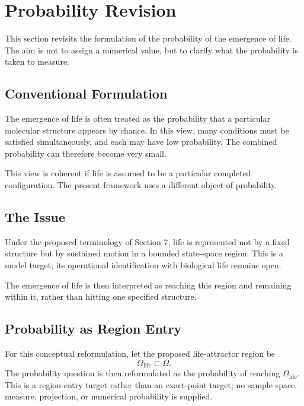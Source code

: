 \section{Probability Revision}

This section revisits the formulation of the probability of the emergence of life. The aim is not to assign a numerical value, but to clarify what the probability is taken to measure.

\subsection{Conventional Formulation}

The emergence of life is often treated as the probability that a particular molecular structure appears by chance. In this view, many conditions must be satisfied simultaneously, and each may have low probability. The combined probability can therefore become very small.

This view is coherent if life is assumed to be a particular completed configuration. The present framework uses a different object of probability.

\subsection{The Issue}

Under the proposed terminology of Section 7, life is represented not by a fixed structure but by sustained motion in a bounded state-space region. This is a model target; its operational identification with biological life remains open.

The emergence of life is then interpreted as reaching this region and remaining within it, rather than hitting one specified structure.

\subsection{Probability as Region Entry}

For this conceptual reformulation, let the proposed life-attractor region be
\begin{equation}
  \Omega_{\mathrm{life}} \subset \Omega.
\end{equation}
The probability question is then reformulated as the probability of reaching \(\Omega_{\mathrm{life}}\). This is a region-entry target rather than an exact-point target; no sample space, measure, projection, or numerical probability is supplied.

